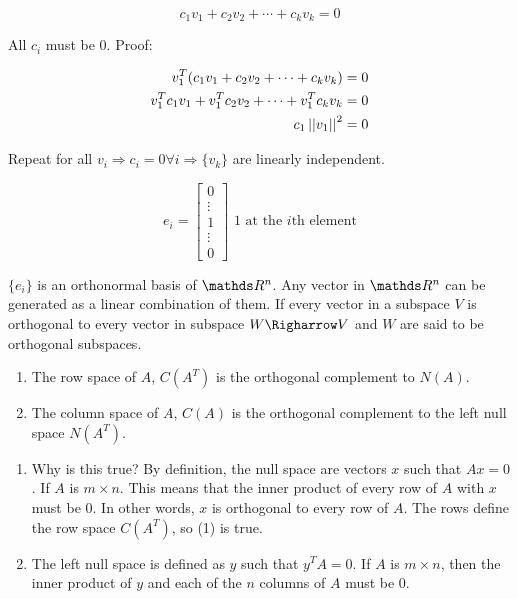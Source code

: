 \[
  c_1v_1 + c_2v_2 + \cdots + c_kv_k=0
\]

All $c_i$ must be 0. Proof:

\begin{align*}
  v_1^T(c_1v_1 + c_2v_2 + \cdots + c_kv_k)&=0 \\
  v_1^Tc_1v_1 + v_1^Tc_2v_2 + \cdots + v_1^Tc_kv_k &=0 \\
  c_1 \left|\left|v_1\right|\right|^2 &= 0
\end{align*}

Repeat for all $v_i \Rightarrow c_i = 0 \forall i \Rightarrow \{v_k\}$ are linearly independent.

\[
  e_i = \begin{bmatrix}
    0 \\ \vdots \\ 1 \\ \vdots \\ 0
  \end{bmatrix} \text{ 1 at the } i\text{th element}
\]

$\{e_i\}$ is an orthonormal basis of $\bbR^n$. Any vector in $\bbR^n$ can be generated as a linear combination of them. If every vector in a subspace $V$ is orthogonal to every vector in subspace $W \Righarrow V$ and $W$ are said to be orthogonal subspaces.

\begin{enumerate}
  \item The row space of $A$, $C(A^T)$ is the orthogonal complement to $N(A)$.
  \item The column space of $A$, $C(A)$ is the orthogonal complement to the left null space $N(A^T)$.
\end{enumerate}

\begin{enumerate}
  \item Why is this true? By definition, the null space are vectors $x$ such that $Ax = 0$. If $A$ is $m \times n$. This means that the inner product of every row of $A$ with $x$ must be 0. In other words, $x$ is orthogonal to every row of $A$. The rows define the row space $C(A^T)$, so (1) is true.
  \item The left null space is defined as $y$ such that $y^TA = 0$. If $A$ is $m \times n$, then the inner product of $y$ and each of the $n$ columns of $A$ must be 0.
\end{enumerate}
